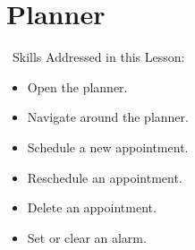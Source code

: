 \documentclass[10pt,letterpaper,twoside]{report}
\begin{document}
{{{%
\clearpage
\section{ Planner}
\
Skills Addressed in this Lesson:
\begin{itemize}
	\item Open the planner.
	\item Navigate around the planner.
	\item Schedule a new appointment.
	\item Reschedule an appointment.
	\item Delete an appointment.
	\item Set or clear an alarm.
\end{itemize}
}}}
\end{document}
